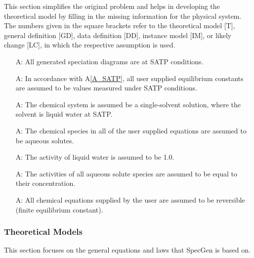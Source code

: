 \documentclass[12pt]{article}
\newcounter{assumpnum} %
\newcommand{\aref}[1]{A\ref{#1}}
\newcommand{\progname}{SpecGen} %
\begin{document}
This section simplifies the original problem and helps in developing the
theoretical model by filling in the missing information for the physical
system. The numbers given in the square brackets refer to the theoretical model
[T], general definition [GD], data definition [DD], instance model [IM], or
likely change [LC], in which the respective assumption is used.

\begin{itemize}

\item[A\refstepcounter{assumpnum}\theassumpnum \label{A_SATP}:]
  All generated speciation diagrams are at SATP conditions.
\item[A\refstepcounter{assumpnum}\theassumpnum \label{A_K_SATP}:]
  In accordance with \aref{A_SATP}, all user supplied equilibrium constants are assumed to be values measured under SATP conditions.
\item[A\refstepcounter{assumpnum}\theassumpnum \label{A_only_wat}:]
  The chemical system is assumed be a single-solvent solution, where the solvent is liquid water at SATP.
\item[A\refstepcounter{assumpnum}\theassumpnum \label{A_only_aq}:]
  The chemical species in all of the user supplied equations are assumed to be aqueous solutes.
\item[A\refstepcounter{assumpnum}\theassumpnum \label{A_act_wat}:]
  The activity of liquid water is assumed to be 1.0.
\item[A\refstepcounter{assumpnum}\theassumpnum \label{A_act_aq}:]
  The activities of all aqueous solute species are assumed to be equal to their concentration.
\item[A\refstepcounter{assumpnum}\theassumpnum \label{A_rev}:]
  All chemical equations supplied by the user are assumed to be reversible (finite equilibrium constant).
\end{itemize}

\subsubsection{Theoretical Models}\label{sec_theoretical}

This section focuses on the general equations and laws that \progname{} is based
on.

~\newline
\end{document}
